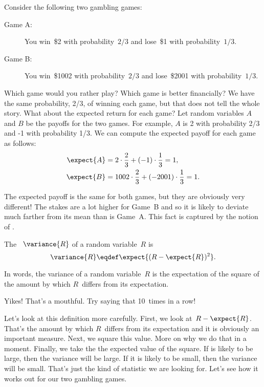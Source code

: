 Consider the following two gambling games:
\begin{description}

\item[Game A:]

You win~\$2 with probability~$2/3$ and lose~\$1 with
probability~$1/3$.

\item[Game B:]

You win~\$1002 with probability~$2/3$ and lose~\$2001 with
probability~$1/3$.

\end{description}
Which game would you rather play?  Which game is better financially?
We have the same probability, 2/3, of winning each game, but that does
not tell the whole story.  What about the expected return for each
game?  Let random variables $A$ and $B$ be the payoffs for the two
games.  For example, $A$ is 2 with probability 2/3 and -1 with
probability 1/3.  We can compute the expected payoff for each game as
follows:
\begin{align*}
    \expect{A} &= 2 \cdot \frac{2}{3} + (-1) \cdot \frac{1}{3} = 1, \\
    \expect{B} &= 1002 \cdot \frac{2}{3} + (-2001) \cdot \frac{1}{3} = 1.
\end{align*}

The expected payoff is the same for both games, but they are obviously
very different! The stakes are a lot higher for Game~B and so it is
likely to deviate much farther from its mean than is Game~A\@.  This
fact is captured by the notion of .

\begin{definition}\label{defvar}
The ~$\variance{R}$ of a random variable~$R$ is
\[
    \variance{R} \eqdef \expect{(R - \expect{R})^2}.
\]
\end{definition}

In words, the variance of a random variable~$R$ is the expectation of
the square of the amount by which $R$~differs from its expectation.

Yikes!  That's a mouthful.  Try saying that 10~times in a row!

Let's look at this definition more carefully.  First, we look at~$R -
\expect{R}$.  That's the amount by which $R$~differs from its
expectation and it is obviously an important measure.  Next, we square
this value.  More on why we do that in a moment.  Finally, we take the
the expected value of the square.
%
%
If  is likely to be large, then the variance will be
large.  If it is likely to be small, then the variance will be small.
That's just the kind of statistic we are looking for.  Let's see how
it works out for our two gambling games.


